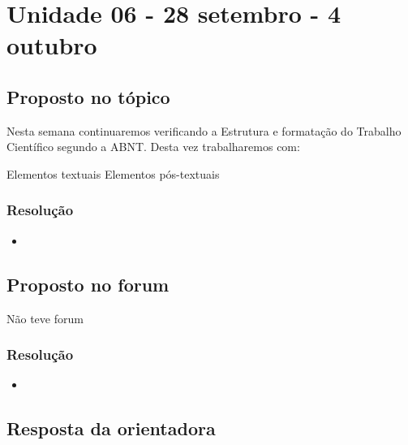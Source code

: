 

\chapter{Unidade 06 - 28 setembro - 4 outubro}

\section{Proposto no tópico}

Nesta semana continuaremos verificando a Estrutura e formatação do Trabalho Científico segundo a ABNT. Desta vez trabalharemos com:

    Elementos textuais
    Elementos pós-textuais


\subsection{Resolução}


\begin{itemize}
  \item 
\end{itemize}

\section{Proposto no forum}

Não teve forum


\subsection{Resolução}

\begin{itemize}
	\item 
\end{itemize}

\section{Resposta da orientadora}

